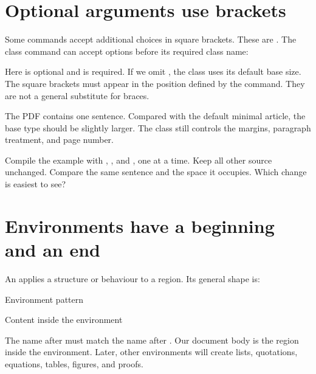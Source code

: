 \section{Optional arguments use brackets}

Some commands accept additional choices in square brackets. These are
. The class command can accept options before its
required class name:


Here \optional{11pt} is optional and  is required. If we
omit \optional{11pt}, the class uses its default base size. The square
brackets must appear in the position defined by the command. They are not a
general substitute for braces.

\expectedoutput

The PDF contains one sentence. Compared with the default minimal article, the
base type should be slightly larger. The class still controls the margins,
paragraph treatment, and page number.

\begin{tryit}
Compile the example with \optional{10pt}, \optional{11pt}, and
\optional{12pt}, one at a time. Keep all other source unchanged. Compare the
same sentence and the space it occupies. Which change is easiest to see?
\end{tryit}

\section{Environments have a beginning and an end}

An  applies a structure or behaviour to a region. Its
general shape is:

\begin{latexcode}{Environment pattern}
\begin{environment-name}
Content inside the environment
\end{environment-name}
\end{latexcode}

The name after  must match the name after . Our document
body is the region inside the  environment. Later, other
environments will create lists, quotations, equations, tables, figures, and
proofs.

